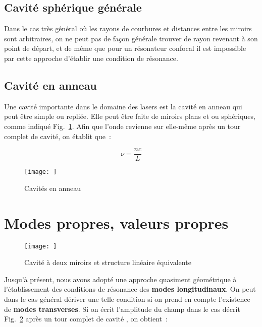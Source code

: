 \documentclass[a4paper]{book}
\begin{document}
\subsection{Cavité sphérique générale}
Dans le cas très général où les rayons de courbures et distances entre les miroirs sont arbitraires, on ne peut pas de façon générale trouver de rayon revenant à son point de départ, et de même que pour un résonateur confocal il est impossible par cette approche d'établir une condition de résonance. 

\subsection{Cavité en anneau}
Une cavité importante dans le domaine des lasers est la cavité en anneau qui peut être simple ou repliée. Elle peut être faite de miroirs plans et ou sphériques, comme indiqué Fig.~\ref{fig:ring_cavity}. Afin que l'onde revienne sur elle-même après un tour complet de cavité, on établit que~:

\begin{equation}
    \nu=\frac{nc}{L}
\end{equation}

\begin{figure}[!htbp]
\begin{center}
\texttt{[image: ]}
\end{center}
\caption{Cavités en anneau}
\label{fig:ring_cavity}
\end{figure}

\section{Modes propres, valeurs propres}


\begin{figure}[!htbp]
\begin{center}
\texttt{[image: ]}
\end{center}
\caption{Cavité à deux miroirs et structure linéaire équivalente}
\label{fig:eigenmodes_cavity}
\end{figure}

Jusqu'à présent, nous avons adopté une approche quasiment géométrique à l'établissement des conditions de résonance des \textbf{modes longitudinaux}. On peut dans le cas général dériver une telle condition si on prend en compte l'existence de \textbf{modes transverses}. 
Si on écrit l'amplitude du champ dans le cas décrit Fig.~\ref{fig:eigenmodes_cavity} après un tour complet de cavité \cite{svelto}, on obtient~:
\end{document}
